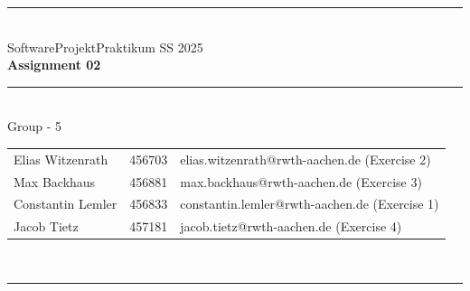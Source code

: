 \documentclass[a4paper,12pt]{article}
\begin{document}
\begin{center}
	\rule{\textwidth}{0.1pt}\\[1cm]
	
	\Large SoftwareProjektPraktikum SS 2025\\\bf Assignment 02
\end{center}


\begin{center}

	\rule{\textwidth}{0.1pt}\\[0.5cm]

	{\Large Group - 5\\[5mm]} %

	\begin{tabular}{lll}
		Elias Witzenrath & 456703 & elias.witzenrath@rwth-aachen.de (Exercise 2) \\

		Max Backhaus & 456881 & max.backhaus@rwth-aachen.de (Exercise 3)\\

		Constantin Lemler & 456833 & constantin.lemler@rwth-aachen.de (Exercise 1)\\

        Jacob Tietz & 457181 & jacob.tietz@rwth-aachen.de (Exercise 4) \\

	\end{tabular}\\[0.5cm]

	\rule{\textwidth}{0.1pt}\\[1cm]

\end{center}






\end{document}
